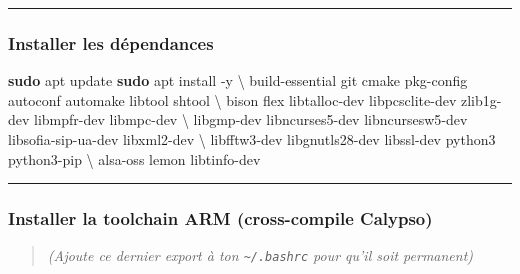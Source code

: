 \documentclass[
]{article}
\newenvironment{Shaded}{\begin{snugshade}}{\end{snugshade}}
\newcommand{\AttributeTok}[1]{\textcolor[rgb]{0.13,0.29,0.53}{#1}}
\newcommand{\BuiltInTok}[1]{#1}
\newcommand{\DataTypeTok}[1]{\textcolor[rgb]{0.13,0.29,0.53}{#1}}
\newcommand{\FunctionTok}[1]{\textcolor[rgb]{0.13,0.29,0.53}{\textbf{#1}}}
\newcommand{\NormalTok}[1]{#1}
\newcommand{\OperatorTok}[1]{\textcolor[rgb]{0.81,0.36,0.00}{\textbf{#1}}}
\newcommand{\VariableTok}[1]{\textcolor[rgb]{0.00,0.00,0.00}{#1}}
\begin{document}
\begin{center}\rule{0.5\linewidth}{0.5pt}\end{center}

\subsubsection{Installer les
dépendances}\label{installer-les-duxe9pendances}

\begin{Shaded}
\begin{Highlighting}[]
\FunctionTok{sudo}\NormalTok{ apt update}
\FunctionTok{sudo}\NormalTok{ apt install }\AttributeTok{{-}y} \DataTypeTok{\textbackslash{}}
\NormalTok{  build{-}essential git cmake pkg{-}config autoconf automake libtool shtool }\DataTypeTok{\textbackslash{}}
\NormalTok{  bison flex libtalloc{-}dev libpcsclite{-}dev zlib1g{-}dev libmpfr{-}dev libmpc{-}dev }\DataTypeTok{\textbackslash{}}
\NormalTok{  libgmp{-}dev libncurses5{-}dev libncursesw5{-}dev libsofia{-}sip{-}ua{-}dev libxml2{-}dev }\DataTypeTok{\textbackslash{}}
\NormalTok{  libfftw3{-}dev libgnutls28{-}dev libssl{-}dev python3 python3{-}pip }\DataTypeTok{\textbackslash{}}
\NormalTok{  alsa{-}oss lemon libtinfo{-}dev}
\end{Highlighting}
\end{Shaded}

\begin{center}\rule{0.5\linewidth}{0.5pt}\end{center}

\subsubsection{Installer la toolchain ARM (cross-compile
Calypso)}\label{installer-la-toolchain-arm-cross-compile-calypso}

\begin{Shaded}
\end{Shaded}

\begin{quote}
\emph{(Ajoute ce dernier export à ton \texttt{\textasciitilde{}/.bashrc}
pour qu'il soit permanent)}
\end{quote}
\end{document}
